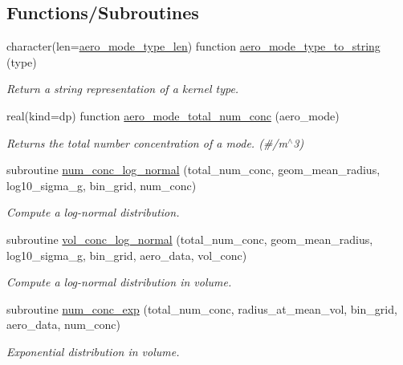 \subsection*{Functions/\+Subroutines}
\begin{DoxyCompactItemize}
\item 
character(len=\mbox{\hyperlink{namespacepmc__aero__mode_a267ddc1551b2f71a22191d1c14577227}{aero\+\_\+mode\+\_\+type\+\_\+len}}) function \mbox{\hyperlink{namespacepmc__aero__mode_abbf5d1701e0dacb20f4b15ed2c21263d}{aero\+\_\+mode\+\_\+type\+\_\+to\+\_\+string}} (type)
\begin{DoxyCompactList}\small\item\em Return a string representation of a kernel type. \end{DoxyCompactList}\item 
real(kind=dp) function \mbox{\hyperlink{namespacepmc__aero__mode_a0ad3b898ec31340554222a17865f44fc}{aero\+\_\+mode\+\_\+total\+\_\+num\+\_\+conc}} (aero\+\_\+mode)
\begin{DoxyCompactList}\small\item\em Returns the total number concentration of a mode. (\#/m$^\wedge$3) \end{DoxyCompactList}\item 
subroutine \mbox{\hyperlink{namespacepmc__aero__mode_a81402ddac6d037dc9667b04d4e534e74}{num\+\_\+conc\+\_\+log\+\_\+normal}} (total\+\_\+num\+\_\+conc, geom\+\_\+mean\+\_\+radius, log10\+\_\+sigma\+\_\+g, bin\+\_\+grid, num\+\_\+conc)
\begin{DoxyCompactList}\small\item\em Compute a log-\/normal distribution. \end{DoxyCompactList}\item 
subroutine \mbox{\hyperlink{namespacepmc__aero__mode_a486d23e34343f1b23fff025be1889602}{vol\+\_\+conc\+\_\+log\+\_\+normal}} (total\+\_\+num\+\_\+conc, geom\+\_\+mean\+\_\+radius, log10\+\_\+sigma\+\_\+g, bin\+\_\+grid, aero\+\_\+data, vol\+\_\+conc)
\begin{DoxyCompactList}\small\item\em Compute a log-\/normal distribution in volume. \end{DoxyCompactList}\item 
subroutine \mbox{\hyperlink{namespacepmc__aero__mode_afcef101dd62d9eea52e00a12bd36550e}{num\+\_\+conc\+\_\+exp}} (total\+\_\+num\+\_\+conc, radius\+\_\+at\+\_\+mean\+\_\+vol, bin\+\_\+grid, aero\+\_\+data, num\+\_\+conc)
\begin{DoxyCompactList}\small\item\em Exponential distribution in volume. \end{DoxyCompactList}\item 

\end{DoxyCompactItemize}
